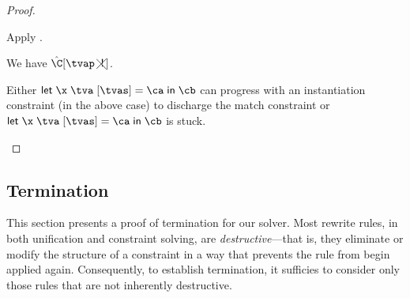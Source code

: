 \documentclass[acmsmall,screen,nonacm,review]{acmart}
\begin{document}
\begin{proof}
\begin{proofcases}
\begin{proofcases}
\begin{proofcases}
\begin{itemize}
		\proofcase{$\tvp \notin \reg \tv \tvs$} Apply .




	    \end{itemize}

	   We have $\nCshape {\hat\C} \tvp$.

	  Either $\cletr \x \tv \tvs \ca \cb$ can progress with an instantiation constraint (in the above case) to discharge
	  the match constraint or $\cletr \x \tv \tvs \ca \cb$ is stuck.
	\end{proofcases}

    \end{proofcases}


  \end{proofcases}
\end{proof}

\subsection{Termination}

This section presents a proof of termination for our solver.
%
Most rewrite rules, in both unification and constraint solving, are
\emph{destructive}---that is, they eliminate or modify the structure of a
constraint in a way that prevents the rule from begin applied again.
%
Consequently, to establish termination, it sufficies to consider only those
rules that are not inherently destructive.
\end{document}
